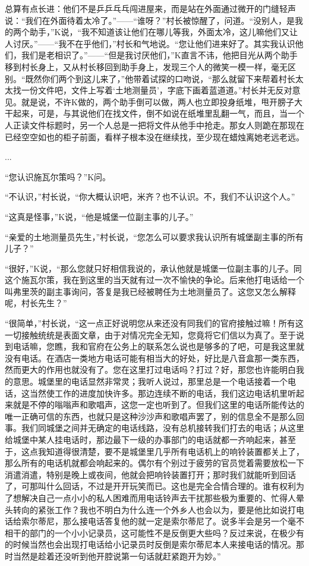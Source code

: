 \documentclass[12pt,a4paper]{article}
\begin{document}
总算有点长进：他们不是乒乒乓乓闯进屋来，而是站在外面通过微开的门缝轻声说：“我们在外面待着太冷了。”——“谁呀？”村长被惊醒了，问道。“没别人，是我的两个助手，”K说，“我不知道该让他们在哪儿等我，外面太冷，这儿嘛他们又让人讨厌。”——“我不在乎他们，”村长和气地说。“您让他们进来好了。其实我认识他们，我们是老相识了。”——“但是我讨厌他们，”K直言不讳，他把目光从两个助手移到村长身上，又从村长移回到助手身上，发现三个人的微笑一模一样，毫无区别。“既然你们两个到这儿来了，”他带着试探的口吻说，“那么就留下来帮着村长太太找一份文件吧，文件上写着‘土地测量员’，字底下画着蓝道道。”村长并无反对意见。就是说，不许K做的，两个助手倒可以做，两人也立即投身纸堆，甩开膀子大干起来，可是，与其说他们在找文件，倒不如说在纸堆里乱翻一气，而且，当一个人正读文件标题时，另一个人总是一把将文件从他手中抢走。那女人则跪在那现在已经空空如也的柜子前面，看样子根本没在继续找，至少现在蜡烛离她老远老远。



...



“您认识施瓦尔策吗？”K问。

“不认识，”村长说，“你大概认识吧，米齐？也不认识。不，我们不认识这个人。”

“这真是怪事，”K说，“他是城堡一位副主事的儿子。”

“亲爱的土地测量员先生，”村长说，“您怎么可以要求我认识所有城堡副主事的所有儿子？”

“很好，”K说，“那么您就只好相信我说的，承认他就是城堡一位副主事的儿子。同这个施瓦尔策，我在到这里的当天就有过一次不愉快的争论。后来他打电话给一个叫弗里茨的副主事询问，答复是我已经被聘任为土地测量员了。这您又怎么解释呢，村长先生？”

“很简单，”村长说，“这一点正好说明您从来还没有同我们的官府接触过嘛！所有这一切接触统统是表面文章，由于对情况完全无知，您竟将它们信以为真了。至于说到电话嘛，您瞧，我和官府在公务上的联系怎么说也是够多的了吧，可是我这里就没有电话。在酒店一类地方电话可能有相当大的好处，好比是八音盒那一类东西，然而更大的作用也就没有了。您在这里打过电话吗？打过？好，那您也许能明白我的意思。城堡里的电话显然非常灵；我听人说过，那里总是一个电话接着一个电话，这当然使工作的进度加快许多。那边连续不断的电话，我们这边电话机里听起来就是不停的嗡嗡声和歌唱声，这您一定也听到了。但我们这里的电话所能传达的唯一正确可信的东西，也就只是这种沙沙声和歌唱声罢了，别的信息全不是那么回事。我们同城堡之间并无确定的电话线路，没有总机接转我们打去的电话；从这里给城堡中某人挂电话时，那边最下一级的办事部门的电话就都一齐响起来，甚至于，这点我知道得很清楚，要不是城堡里几乎所有电话机上的响铃装置都关上了，那么所有的电话机就都会响起来的。偶尔有个别过于疲劳的官员觉着需要放松一下消遣消遣，特别是晚上或夜间，他就会把响铃装置打开；那时我们就能听到回话了，可那叫什么回话，不过是开开玩笑而已。这也是完全合情合理的。谁有权利为了想解决自己一点小小的私人困难而用电话铃声去干扰那些极为重要的、忙得人晕头转向的紧张工作？我也不明白为什么连一个外乡人也会以为，要是他比如说打电话给索尔蒂尼，那么接电话答复他的就一定是索尔蒂尼了。说多半会是另一个毫不相干的部门的一个小小记录员，这可能性不是反倒更大些吗？反过来说，在极少有的时候当然也会出现打电话给小记录员时反倒是索尔蒂尼本人来接电话的情况。那时当然是趁着还没听到他开腔说第一句话就赶紧跑开为妙。”
\par{}
\newpage
\end{document}
